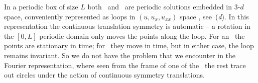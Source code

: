 In a periodic box of size $L$
both \eqva\ and \reqva\ are  periodic solutions
embedded in 3-$d$ space, conveniently represented as loops in
$(u,u_x,u_{xx})$ space%
, see \,(\textit{d}).
In this representation the continuous translation symmetry
is automatic -- a rotation in the $[0,L]$ periodic domain only
moves the points along the loop. For an \eqv\ the points
are stationary in time; for \reqv\ they move in time, but in
either case, the loop remains invariant.
So we do not have the problem that we encounter in the Fourier
representation, where seen from the frame of one of the \eqva\
the rest trace out circles under the action of continuous symmetry
translations.




